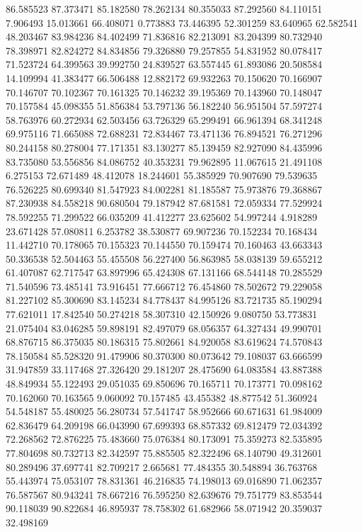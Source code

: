 86.585523
87.373471
85.182580
78.262134
80.355033
87.292560
84.110151
7.906493
15.013661
66.408071
0.773883
73.446395
52.301259
83.640965
62.582541
48.203467
83.984236
84.402499
71.836816
82.213091
83.204399
80.732940
78.398971
82.824272
84.834856
79.326880
79.257855
54.831952
80.078417
71.523724
64.399563
39.992750
24.839527
63.557445
61.893086
20.508584
14.109994
41.383477
66.506488
12.882172
69.932263
70.150620
70.166907
70.146707
70.102367
70.161325
70.146232
39.195369
70.143960
70.148047
70.157584
45.098355
51.856384
53.797136
56.182240
56.951504
57.597274
58.763976
60.272934
62.503456
63.726329
65.299491
66.961394
68.341248
69.975116
71.665088
72.688231
72.834467
73.471136
76.894521
76.271296
80.244158
80.278004
77.171351
83.130277
85.139459
82.927090
84.435996
83.735080
53.556856
84.086752
40.353231
79.962895
11.067615
21.491108
6.275153
72.671489
48.412078
18.244601
55.385929
70.907690
79.539635
76.526225
80.699340
81.547923
84.002281
81.185587
75.973876
79.368867
87.230938
84.558218
90.680504
79.187942
87.681581
72.059334
77.529924
78.592255
71.299522
66.035209
41.412277
23.625602
54.997244
4.918289
23.671428
57.080811
6.253782
38.530877
69.907236
70.152234
70.168434
11.442710
70.178065
70.155323
70.144550
70.159474
70.160463
43.663343
50.336538
52.504463
55.455508
56.227400
56.863985
58.038139
59.655212
61.407087
62.717547
63.897996
65.424308
67.131166
68.544148
70.285529
71.540596
73.485141
73.916451
77.666712
76.454860
78.502672
79.229058
81.227102
85.300690
83.145234
84.778437
84.995126
83.721735
85.190294
77.621011
17.842540
50.274218
58.307310
42.150926
9.080750
53.773831
21.075404
83.046285
59.898191
82.497079
68.056357
64.327434
49.990701
68.876715
86.375035
80.186315
75.802661
84.920058
83.619624
74.570843
78.150584
85.528320
91.479906
80.370300
80.073642
79.108037
63.666599
31.947859
33.117468
27.326420
29.181207
28.475690
64.083584
43.887388
48.849934
55.122493
29.051035
69.850696
70.165711
70.173771
70.098162
70.162060
70.163565
9.060092
70.157485
43.455382
48.877542
51.360924
54.548187
55.480025
56.280734
57.541747
58.952666
60.671631
61.984009
62.836479
64.209198
66.043990
67.699393
68.857332
69.812479
72.034392
72.268562
72.876225
75.483660
75.076384
80.173091
75.359273
82.535895
77.804698
80.732713
82.342597
75.885505
82.322496
68.140790
49.312601
80.289496
37.697741
82.709217
2.665681
77.484355
30.548894
36.763768
55.443974
75.053107
78.831361
46.216835
74.198013
69.016890
71.062357
76.587567
80.943241
78.667216
76.595250
82.639676
79.751779
83.853544
90.118039
90.822684
46.895937
78.758302
61.682966
58.071942
20.359037
32.498169
